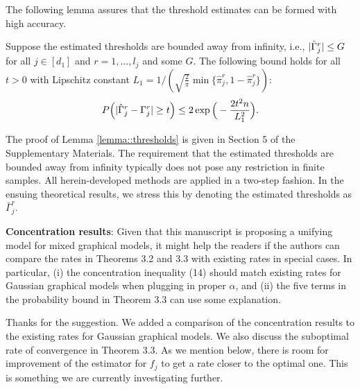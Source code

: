 \begin{change}
    The following lemma assures that the threshold estimates can be formed with high accuracy.
    \begin{lemma}\label{lemma::thresholds}
        Suppose the estimated thresholds are bounded away from infinity, i.e., \(\lvert\hat\Gamma^r_j\rvert \leq G\) for all $j \in [d_1]$ and $r = 1, \dots, l_j$ and some \(G\). The following bound holds for all $t > 0$ with Lipschitz constant \(L_1 = 1/(\sqrt{\frac{2}{\pi}} \min\{\hat\pi^r_j, 1- \hat\pi^r_j\})\):
        \begin{equation*}
            P\Big(\Abs{\hat\Gamma_j^r - \Gamma_j^r} \geq t \Big) \leq 2\exp{\Big(- \frac{2t^2n}{L_1^2}\Big)}.
        \end{equation*}
    \end{lemma}

    The proof of Lemma \ref{lemma::thresholds} is given in Section 5 %
    of the Supplementary Materials. The requirement that the estimated thresholds are bounded away from infinity typically does not pose any restriction in finite samples. All herein-developed methods are applied in a two-step fashion. In the ensuing theoretical results, we stress this by denoting the estimated thresholds as $\bar{\Gamma}_j^r$.
\end{change}


\begin{point}
    \textbf{Concentration results}: Given that this manuscript is proposing a unifying model for mixed graphical models, it might help the readers if the authors can compare the rates in Theorems 3.2 and 3.3 with existing rates in special cases. In particular, (i) the concentration inequality (14) should match existing rates for Gaussian graphical models when plugging in proper \(\alpha\), and (ii) the five terms in the probability bound in Theorem 3.3 can use some explanation.
\end{point}

\begin{reply}
    Thanks for the suggestion. We added a comparison of the concentration results to the existing rates for Gaussian graphical models. We also discuss the suboptimal rate of convergence in Theorem 3.3. As we mention below, there is room for improvement of the estimator for \(f_j\) to get a rate closer to the optimal one. This is something we are currently investigating further.
\end{reply}


